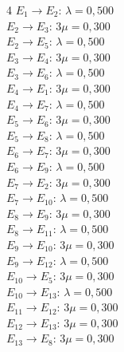 \begin{multicols}{4}\footnotesize
$E_{1}\to E_{2}$: $\lambda=0{,}500$\\$E_{2}\to E_{3}$: $3\mu=0{,}300$\\$E_{2}\to E_{5}$: $\lambda=0{,}500$\\$E_{3}\to E_{4}$: $3\mu=0{,}300$\\$E_{3}\to E_{6}$: $\lambda=0{,}500$\\$E_{4}\to E_{1}$: $3\mu=0{,}300$\\$E_{4}\to E_{7}$: $\lambda=0{,}500$\\$E_{5}\to E_{6}$: $3\mu=0{,}300$\\$E_{5}\to E_{8}$: $\lambda=0{,}500$\\$E_{6}\to E_{7}$: $3\mu=0{,}300$\\$E_{6}\to E_{9}$: $\lambda=0{,}500$\\$E_{7}\to E_{2}$: $3\mu=0{,}300$\\$E_{7}\to E_{10}$: $\lambda=0{,}500$\\$E_{8}\to E_{9}$: $3\mu=0{,}300$\\$E_{8}\to E_{11}$: $\lambda=0{,}500$\\$E_{9}\to E_{10}$: $3\mu=0{,}300$\\$E_{9}\to E_{12}$: $\lambda=0{,}500$\\$E_{10}\to E_{5}$: $3\mu=0{,}300$\\$E_{10}\to E_{13}$: $\lambda=0{,}500$\\$E_{11}\to E_{12}$: $3\mu=0{,}300$\\$E_{12}\to E_{13}$: $3\mu=0{,}300$\\$E_{13}\to E_{8}$: $3\mu=0{,}300$
\end{multicols}